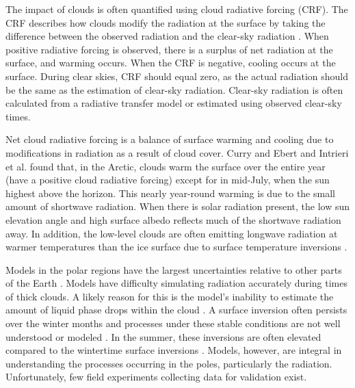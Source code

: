 The impact of clouds is often quantified using cloud radiative forcing (CRF). The CRF describes how clouds modify the radiation at the surface by taking the difference between the observed radiation and the clear-sky radiation \cite{Ramanathan:1989tl}. When positive radiative forcing is observed, there is a surplus of net radiation at the surface, and warming occurs. When the CRF is negative, cooling occurs at the surface. During clear skies, CRF should equal zero, as the actual radiation should be the same as the estimation of clear-sky radiation. Clear-sky radiation is often calculated from a radiative transfer model or estimated using observed clear-sky times.

Net cloud radiative forcing is a balance of surface warming and cooling due to modifications in radiation as a result of cloud cover. Curry and Ebert \cite{Curry:1992vn} and Intrieri et al. \cite{Intrieri:2002cn} found that, in the Arctic, clouds warm the surface over the entire year (have a positive cloud radiative forcing) except for in mid-July, when the sun highest above the horizon. This nearly year-round warming is due to the small amount of shortwave radiation. When there is solar radiation present, the low sun elevation angle and high surface albedo reflects much of the shortwave radiation away. In addition, the low-level clouds are often emitting longwave radiation at warmer temperatures than the ice surface due to surface temperature inversions \cite{Shupe:2003vt}.

Models in the polar regions have the largest uncertainties relative to other parts of the Earth \cite{Holland:2003hg} \cite{AACI:05}. Models have difficulty simulating radiation accurately during times of thick clouds. A likely reason for this is the model’s inability to estimate the amount of liquid phase drops within the cloud \cite{Graham:2017cs}. A surface inversion often persists over the winter months and processes under these stable conditions are not well understood or modeled \cite{Tastula:2012fta}. In the summer, these inversions are often elevated compared to the wintertime surface inversions \cite{Serreze:1992vz}. Models, however, are integral in understanding the processes occurring in the poles, particularly the radiation.  Unfortunately, few field experiments collecting data for validation exist.

